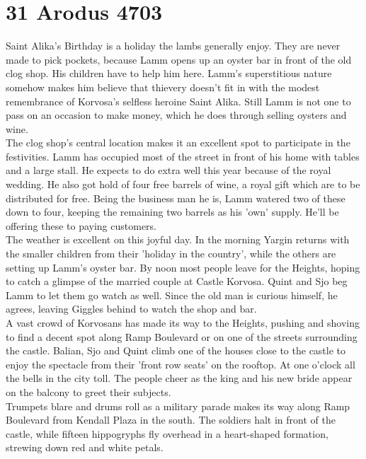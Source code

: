 \section{31 Arodus 4703}

Saint Alika's Birthday is a holiday the lambs generally enjoy. They are never made to pick pockets, because Lamm opens up an oyster bar in front of the old clog shop. His children have to help him here. Lamm's superstitious nature somehow makes him believe that thievery doesn't fit in with the modest remembrance of Korvosa's selfless heroine Saint Alika. Still Lamm is not one to pass on an occasion to make money, which he does through selling oysters and wine.\\

The clog shop's central location makes it an excellent spot to participate in the festivities. Lamm has occupied most of the street in front of his home with tables and a large stall. He expects to do extra well this year because of the royal wedding. He also got hold of four free barrels of wine, a royal gift which are to be distributed for free. Being the business man he is, Lamm watered two of these down to four, keeping the remaining two barrels as his 'own' supply. He'll be offering these to paying customers.\\

The weather is excellent on this joyful day. In the morning Yargin returns with the smaller children from their 'holiday in the country', while the others are setting up Lamm's oyster bar. By noon most people leave for the Heights, hoping to catch a glimpse of the married couple at Castle Korvosa. Quint and Sjo beg Lamm to let them go watch as well. Since the old man is curious himself, he agrees, leaving Giggles behind to watch the shop and bar.\\

A vast crowd of Korvosans has made its way to the Heights, pushing and shoving to find a decent spot along Ramp Boulevard or on one of the streets surrounding the castle. Balian, Sjo and Quint climb one of the houses close to the castle to enjoy the spectacle from their 'front row seats' on the rooftop. At one o'clock all the bells in the city toll. The people cheer as the king and his new bride appear on the balcony to greet their subjects.\\

Trumpets blare and drums roll as a military parade makes its way along Ramp Boulevard from Kendall Plaza in the south. The soldiers halt in front of the castle, while fifteen hippogryphs fly overhead in a heart-shaped formation, strewing down red and white petals.\\


